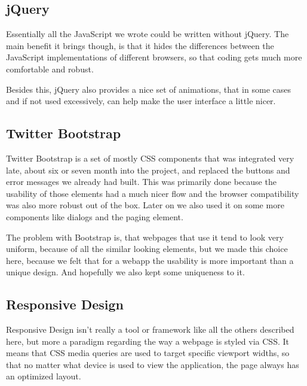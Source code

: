 \subsection{jQuery}

Essentially all the JavaScript we wrote could be written without jQuery. The main benefit it brings though, is that it hides the differences between the JavaScript implementations of different browsers, so that coding gets much more comfortable and robust.

Besides this, jQuery also provides a nice set of animations, that in some cases and if not used excessively, can help make the user interface a little nicer.

\subsection{Twitter Bootstrap}

Twitter Bootstrap is a set of mostly CSS components that was integrated very late, about six or seven month into the project, and replaced the buttons and error messages we already had built. This was primarily done because the usability of those elements had a much nicer flow and the browser compatibility was also more robust out of the box.
Later on we also used it on some more components like dialogs and the paging element.

The problem with Bootstrap is, that webpages that use it tend to look very uniform, because of all the similar looking elements, but we made this choice here, because we felt that for a webapp the usability is more important than a unique design. And hopefully we also kept some uniqueness to it.

\subsection{Responsive Design}

Responsive Design isn't really a tool or framework like all the others described here, but more a paradigm regarding the way a webpage is styled via CSS. It means that CSS media queries are used to target specific viewport widths, so that no matter what device is used to view the application, the page always has an optimized layout.